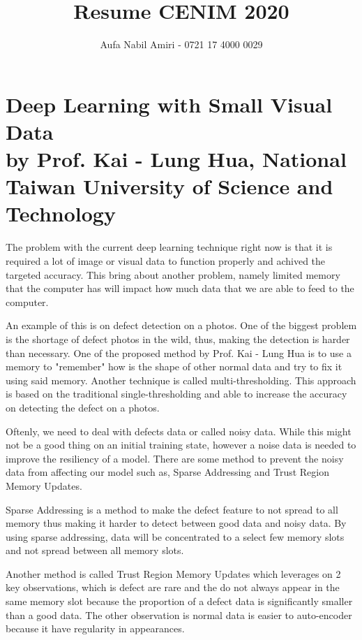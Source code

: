 \documentclass[12pt, a4paper]{article}
\title{Resume CENIM 2020}
\author{Aufa Nabil Amiri - 0721 17 4000 0029}
\date{}
\makeatletter
\renewcommand{\maketitle}{
    \bgroup\setlength{\parindent}{0pt}
    \begin{flushleft}
        \LARGE\textbf{\@title}

        \normalsize\@author
    \end{flushleft}\egroup
}
\makeatother
\begin{document}
\maketitle

\section*{Deep Learning with Small Visual Data \\
  \footnotesize by Prof. Kai - Lung Hua, National Taiwan University of Science and Technology}

The problem with the current deep learning technique right now is that it is required a lot of image or visual data to function properly and achived the targeted accuracy. This bring about another problem, namely limited memory that the computer has will impact how much data that we are able to feed to the computer.

An example of this is on defect detection on a photos. One of the biggest problem is the shortage of defect photos in the wild, thus, making the detection is harder than necessary. One of the proposed method by Prof. Kai - Lung Hua is to use a memory to "remember" how is the shape of other normal data and try to fix it using said memory. Another technique is called multi-thresholding. This approach is based on the traditional single-thresholding and able to increase the accuracy on detecting the defect on a photos.

Oftenly, we need to deal with defects data or called noisy data. While this might not be a good thing on an initial training state, however a noise data is needed to improve the resiliency of a model. There are some method to prevent the noisy data from affecting our model such as, Sparse Addressing and Trust Region Memory Updates.

Sparse Addressing is a method to make the defect feature to not spread to all memory thus making it harder to detect between good data and noisy data. By using sparse addressing, data will be concentrated to a select few memory slots and not spread between all memory slots.

Another method is called Trust Region Memory Updates which leverages on 2 key observations, which is defect are rare and the do not always appear in the same memory slot because the proportion of a defect data is significantly smaller than a good data. The other observation is normal data is easier to auto-encoder because it have regularity in appearances.
\end{document}
